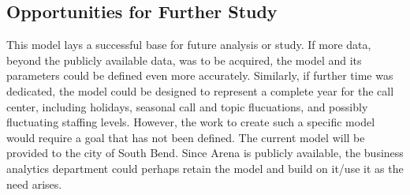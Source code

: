 \documentclass[12pt,twocolumn]{article}
\begin{document}
	\subsection{Opportunities for Further Study}

	This model lays a successful base for future analysis or study.  If more data, beyond the publicly available data, was to be acquired, the model and its parameters could be defined even more accurately.  Similarly, if further time was dedicated, the model could be designed to represent a complete year for the call center, including holidays, seasonal call and topic flucuations, and possibly fluctuating staffing levels.  However, the work to create such a specific model would require a goal that has not been defined.  The current model will be provided to the city of South Bend.  Since Arena is publicly available, the business analytics department could perhaps retain the model and build on it/use it as the need arises.
\end{document}
